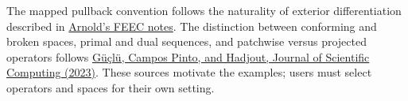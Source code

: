 \documentclass[11pt,a4paper]{article}
\begin{document}
The mapped pullback convention follows the naturality of exterior differentiation described in \href{https://www-users.cse.umn.edu/~arnold/feec-cbms/feec.pdf}{Arnold's FEEC notes}. The distinction between conforming and broken spaces, primal and dual sequences, and patchwise versus projected operators follows \href{https://link.springer.com/article/10.1007/s10915-023-02351-x}{Güçlü, Campos Pinto, and Hadjout, Journal of Scientific Computing (2023)}. These sources motivate the examples; users must select operators and spaces for their own setting.
\end{document}

